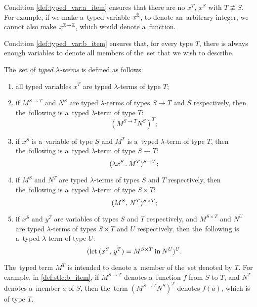 Condition \ref{def:typed_var:a_item} ensures that there are no $x^T$, $x^S$ with
$T \not\equiv S$. For example, if we make a~typed variable $x^{\mathbb{Z}}$, to denote
an~arbitrary integer, we cannot also make $x^{\mathbb{Z} \to \mathbb{Z}}$, which would
denote a~function.

Condition \ref{def:typed_var:b_item} ensures that, for every type $T$, there
is always enough variables to denote all members of the~set that we wish to
describe.

\begin{definition}\label{def:stlc}
  The~set of \emph{typed $\lambda$-terms} is defined as follows:
  \begin{enumerate}
    \item all typed variables $x^T$ are typed $\lambda$-terms of type $T$;
    \item \label{def:stlc:b_item} if $M^{S \to T}$ and $N^S$ are
      typed $\lambda$-terms of types $S \to T$ and $S$
      respectively, then the~following is a~typed $\lambda$-term of type $T$:
      \[
        (M^{S \to T} N^S)^T;
      \]
    \item if $x^S$ is a~variable of type $S$ and $M^T$ is a~typed
      $\lambda$-term of type $T$, then the~following is a~typed
      $\lambda$-term of type $S \to T$:
      \[
        (\lambda x^S \, . \: M^T)^{S \to T};
      \]
    \item \label{def:stlc:d_item} if $M^S$ and $N^T$ are typed
      $\lambda$-terms of types $S$ and $T$ respectively, then
      the~following is a~typed $\lambda$-term of type $S \times T$:
      \[
        (M^S, \, N^T) ^{S \times T};
      \]
    \setcounter{stlc_counter}{\value{enumi}}
    \item \label{def:stlc:e_item} if $x^S$ and $y^T$ are variables of
      types $S$ and $T$ respectively, and $M^{S \times T}$ and
      $N^U$ are typed $\lambda$-terms of types $S \times T$ and
      $U$ respectively, then the~following is a~typed $\lambda$-term of type
      $U$:
      \[
        (\textrm{let} \: (x^S, \, y^T) = M^{S \times T} \:
        \textrm{in} \: N^{U})^U.
      \]
\end{enumerate}
\end{definition}

The~typed term $M^T$ is intended to denote a~member of the~set denoted by
$T$. For example, in \ref{def:stlc:b_item}, if $M^{S \to T}$ denotes
a~function $f$ from $S$ to $T$, and $N^T$ denotes a~member $a$ of
$S$, then the~term $(M^{S \to T} N^S)^T$ denotes $f(a)$,
which is of type $T$.

